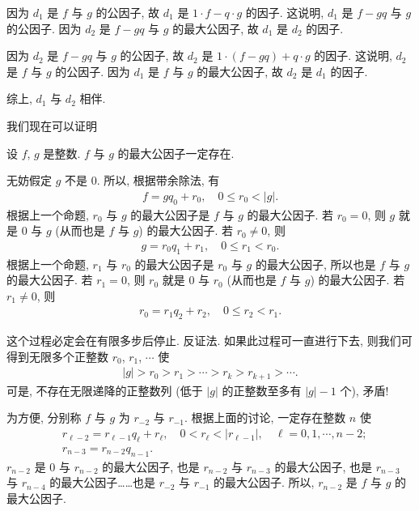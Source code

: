 \begin{pf}
    因为 $d_1$ 是 $f$ 与 $g$ 的公因子, 故 $d_1$ 是 $1 \cdot f - q \cdot g$ 的因子. 这说明, $d_1$ 是 $f - gq$ 与 $g$ 的公因子. 因为 $d_2$ 是 $f - gq$ 与 $g$ 的最大公因子, 故 $d_1$ 是 $d_2$ 的因子.

    因为 $d_2$ 是 $f - gq$ 与 $g$ 的公因子, 故 $d_2$ 是 $1 \cdot (f - gq) + q \cdot g$ 的因子. 这说明, $d_2$ 是 $f$ 与 $g$ 的公因子. 因为 $d_1$ 是 $f$ 与 $g$ 的最大公因子, 故 $d_2$ 是 $d_1$ 的因子.

    综上, $d_1$ 与 $d_2$ 相伴.
\end{pf}

我们现在可以证明
\begin{proposition}
    设 $f$, $g$ 是整数. $f$ 与 $g$ 的最大公因子一定存在.
\end{proposition}

\begin{pf}
    无妨假定 $g$ 不是 $0$. 所以, 根据带余除法, 有
    \begin{align*}
        f = gq_0 + r_0, \quad 0 \leq r_0 < |g|.
    \end{align*}
    根据上一个命题, $r_0$ 与 $g$ 的最大公因子是 $f$ 与 $g$ 的最大公因子. 若 $r_0 = 0$, 则 $g$ 就是 $0$ 与 $g$ (从而也是 $f$ 与 $g$) 的最大公因子. 若 $r_0 \neq 0$, 则
    \begin{align*}
        g = r_0 q_1 + r_1, \quad 0 \leq r_1 < r_0.
    \end{align*}
    根据上一个命题, $r_1$ 与 $r_0$ 的最大公因子是 $r_0$ 与 $g$ 的最大公因子, 所以也是 $f$ 与 $g$ 的最大公因子. 若 $r_1 = 0$, 则 $r_0$ 就是 $0$ 与 $r_0$ (从而也是 $f$ 与 $g$) 的最大公因子. 若 $r_1 \neq 0$, 则
    \begin{align*}
        r_0 = r_1 q_2 + r_2, \quad 0 \leq r_2 < r_1.
    \end{align*}

    这个过程必定会在有限多步后停止. 反证法. 如果此过程可一直进行下去, 则我们可得到无限多个正整数 $r_0$, $r_1$, $\cdots$ 使
    \begin{align*}
        |g| > r_0 > r_1 > \cdots > r_k > r_{k+1} > \cdots.
    \end{align*}
    可是, 不存在无限递降的正整数列 (低于 $|g|$ 的正整数至多有 $|g| - 1$ 个), 矛盾!

    为方便, 分别称 $f$ 与 $g$ 为 $r_{-2}$ 与 $r_{-1}$. 根据上面的讨论, 一定存在整数 $n$ 使
    \begin{align*}
         & r_{\ell - 2} = r_{\ell - 1} q_{\ell} + r_{\ell}, \quad 0 < r_{\ell} < |r_{\ell - 1}|, \quad \ell = 0,1,\cdots,n-2; \\
         & r_{n - 3} = r_{n - 2} q_{n - 1}.
    \end{align*}
    $r_{n-2}$ 是 $0$ 与 $r_{n-2}$ 的最大公因子, 也是 $r_{n-2}$ 与 $r_{n-3}$ 的最大公因子, 也是 $r_{n-3}$ 与 $r_{n-4}$ 的最大公因子……也是 $r_{-2}$ 与 $r_{-1}$ 的最大公因子. 所以, $r_{n-2}$ 是 $f$ 与 $g$ 的最大公因子.
\end{pf}


